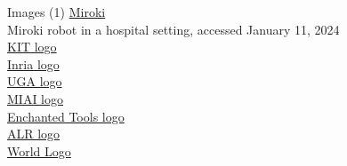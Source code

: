 \documentclass[navbaroff]{sdqbeamer}
\begin{document}
\begin{frame}{Images}
    (1) \href{https://www.kuka.com/-/media/kuka-corporate/images/industries/automotive}{Miroki}\\
    \hspace{1cm} Miroki robot in a hospital setting, accessed January 11, 2024\\
    \href{https://fr.wikipedia.org/wiki/Fichier:Logo_KIT.svg}{KIT logo}\\
    \href{https://www.minalogic.com/annuaire/inria-grenoble-rhone-alpes/}{Inria logo}\\
    \href{https://fr.m.wikipedia.org/wiki/Fichier:Logo_Universit\%C3\%A9_Grenoble_Alpes_2020.svg}{UGA logo}\\
    \href{https://miai.univ-grenoble-alpes.fr/}{MIAI logo}\\
    \href{https://commons.wikimedia.org/wiki/File:Enchanted_Tools_Logo.svg}{Enchanted Tools logo}\\
    \href{https://alr.iar.kit.edu/}{ALR logo}\\
    \href{https://pngtree.com/element/down?id=NTQ3Mjc1OA==&type=1&time=1793107074&token=NDYzZWI5NmU4MjIwZjFlYmM4NGQ1Mzk4MTYwYmQ5NWQ=&t=0}{World Logo}\\
\end{frame}

\backupend
\end{document}
